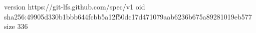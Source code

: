 version https://git-lfs.github.com/spec/v1
oid sha256:49905d330b1bbb644fcbb5a12f50dc17d471079aab6236b675a89281019eb577
size 336
